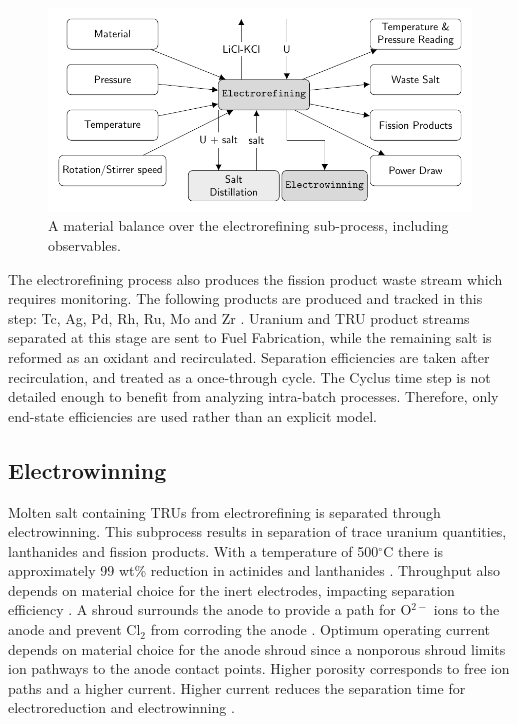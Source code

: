 \documentclass{anstrans}
\begin{document}
\begin{figure}[ht]
	\centering
	\includegraphics[width=1\linewidth]{refining}
	\caption{A material balance over the electrorefining sub-process, including observables.}
	\label{fig:refining}
\end{figure}

The electrorefining process also produces the fission product waste stream which requires monitoring. The following products are produced 
and tracked in this step: Tc, Ag, Pd, Rh, Ru, Mo and Zr \cite{flowsheet_1998}. Uranium and TRU product streams separated at this stage are sent to Fuel Fabrication, while the remaining salt is reformed as an oxidant and recirculated.
Separation efficiencies are taken after recirculation, and treated as a once-through cycle. The Cyclus time step
is not detailed enough to benefit from analyzing intra-batch processes. Therefore, only end-state efficiencies are used rather than an explicit model.

\subsection{Electrowinning}

Molten salt containing TRUs from electrorefining is separated through electrowinning. This subprocess results in separation of trace uranium quantities, lanthanides and fission products. 
With a temperature of 500$^{\circ}$C there is approximately 99 wt\% reduction in actinides and lanthanides \cite{flowsheet_1998}. 
Throughput also depends on material choice for the inert electrodes, impacting separation 
efficiency \cite{koyama_development_2012}. A shroud surrounds the anode to provide a path for O$^{2-}$ ions to the anode and 
prevent Cl$_2$ from corroding the anode \cite{kim_development_2013,choi_electrochemical_2015}. Optimum operating current 
depends on material choice for the anode shroud since a nonporous shroud limits ion pathways to the anode contact points.
Higher porosity corresponds to free ion paths and a higher current. Higher current reduces the separation 
time for electroreduction and electrowinning \cite{choi_electrochemical_2015}.
\end{document}
